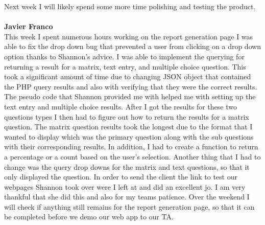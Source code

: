 \documentclass[../final.tex]{subfiles}
\begin{document}
Next week I will likely spend some more time polishing and testing the product. \\ \\
\textbf{Javier Franco}\\
This week I spent numerous hours working on the report generation page I was able to fix the drop down bug that prevented a user from clicking on a drop down option thanks to Shannon's advice. I was able to implement the querying for returning a result for a matrix, text entry, and multiple choice question. This took a significant amount of time due to changing JSON object that contained the PHP query results and also with verifying that they were the correct results. The pseudo code that Shannon provided me with helped me with setting up the text entry and multiple choice results. After I got the results for these two questions types I then had to figure out how to return the results for a matrix question. The matrix question results took the longest due to the format that I wanted to display which was the primary question along with the sub questions with their corresponding results. In addition, I had to create a function to return a percentage or a count based on the user's selection. Another thing that I had to change was the query drop downs for the matrix and text questions, so that it only displayed the question. In order to send the client the link to test our webpages Shannon took over were I left at and did an excellent jo. I am very thankful that she did this and also for my teams patience. Over the weekend I will check if anything still remains for the report generation page, so that it can be completed before we demo our web app to our TA. \\
\end{document}
